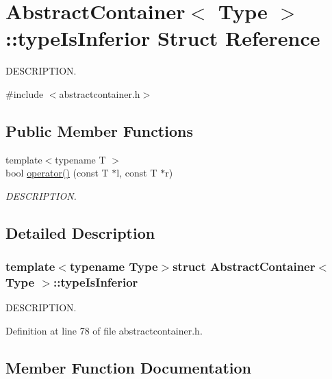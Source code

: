 \hypertarget{struct_abstract_container_1_1type_is_inferior}{}\section{Abstract\+Container$<$ Type $>$\+:\+:type\+Is\+Inferior Struct Reference}
\label{struct_abstract_container_1_1type_is_inferior}


D\+E\+S\+C\+R\+I\+P\+T\+I\+O\+N.  




{\ttfamily \#include $<$abstractcontainer.\+h$>$}

\subsection*{Public Member Functions}
\begin{DoxyCompactItemize}
\item 
{\footnotesize template$<$typename T $>$ }\\bool \hyperlink{struct_abstract_container_1_1type_is_inferior_ae3edb936aa739dd524e8d422d57da5b8}{operator()} (const T $\ast$l, const T $\ast$r)
\begin{DoxyCompactList}\small\item\em D\+E\+S\+C\+R\+I\+P\+T\+I\+O\+N. \end{DoxyCompactList}\end{DoxyCompactItemize}


\subsection{Detailed Description}
\subsubsection*{template$<$typename Type$>$struct Abstract\+Container$<$ Type $>$\+::type\+Is\+Inferior}

D\+E\+S\+C\+R\+I\+P\+T\+I\+O\+N. 

Definition at line 78 of file abstractcontainer.\+h.



\subsection{Member Function Documentation}
\hypertarget{struct_abstract_container_1_1type_is_inferior_ae3edb936aa739dd524e8d422d57da5b8}{}
